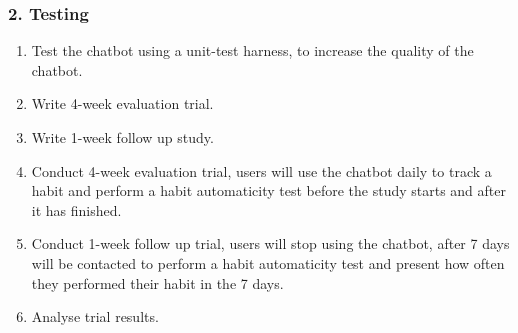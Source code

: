 \subsubsection*{2. Testing}

\begin{enumerate}
 \item Test the chatbot using a unit-test harness, to increase the quality of the chatbot.
 \item Write 4-week evaluation trial.
 \item Write 1-week follow up study.
 \item Conduct 4-week evaluation trial, users will use the chatbot daily to track a habit and perform a habit automaticity test before the study starts and after it has finished.
 \item Conduct 1-week follow up trial, users will stop using the chatbot, after 7 days will be contacted to perform a habit automaticity test and present how often they performed their habit in the 7 days.
 \item Analyse trial results.
\end{enumerate}

